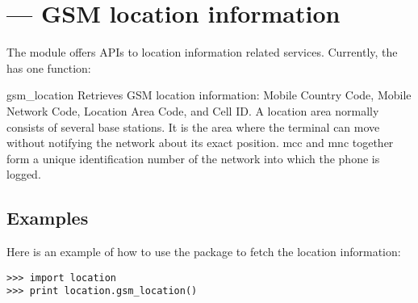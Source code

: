 %
%
%

\section{ ---
	 GSM location information}
\label{sec:location}


The  module offers APIs to location information related 
services. Currently, the  has one function:

\begin{funcdesc}{gsm_location}{}
Retrieves GSM location information: Mobile Country Code, Mobile Network Code, 
Location Area Code, and Cell ID. A location area normally consists of several 
base stations. It is the area where the terminal can move without notifying the 
network about its exact position. mcc and mnc together form a unique 
identification number of the network into which the phone is logged.
\end{funcdesc}

\subsection{Examples}

Here is an example of how to use the  package to
fetch the location information:

\begin{verbatim}
>>> import location
>>> print location.gsm_location()
\end{verbatim}
